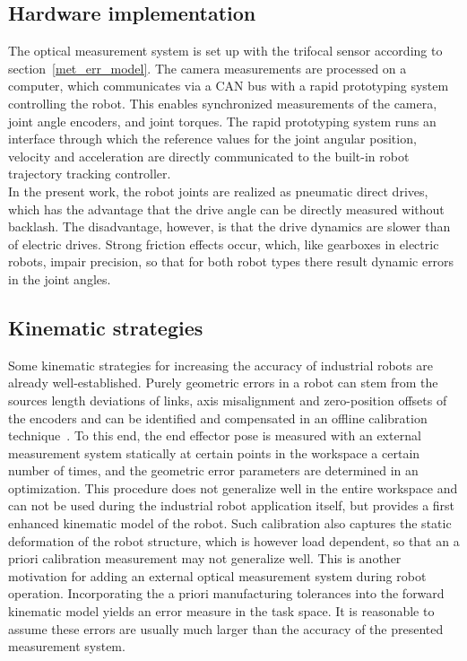 \documentclass[5p,times,procedia]{elsarticle}
\begin{document}
\subsection{Hardware implementation}
The optical measurement system is set up with the trifocal sensor according to section~\ref{met_err_model}.
The camera measurements are processed on a computer, which communicates via a CAN bus with a rapid prototyping system controlling the robot.
This enables synchronized measurements of the camera, joint angle encoders, and joint torques.
The rapid prototyping system runs an interface through which the reference values for the joint angular position, velocity and acceleration are directly communicated to the built-in robot trajectory tracking controller.\\
In the present work, the robot joints are realized as pneumatic direct drives, which has the advantage that the drive angle can be directly measured without backlash. 
The disadvantage, however, is that the drive dynamics are slower than of electric drives. Strong friction effects occur, which, like gearboxes in electric robots, impair precision, so that for both robot types there result dynamic errors in the joint angles. 


\subsection{Kinematic strategies}
Some kinematic strategies for increasing the accuracy of industrial robots are already well-established.
Purely geometric errors in a robot can stem from the sources length deviations of links, axis misalignment and zero-position offsets of the encoders and can be identified and compensated in an offline calibration technique~\cite{Wiest01}.
To this end, the end effector pose is measured with an external measurement system statically at certain points in the workspace a certain number of times, and the geometric error parameters are determined in an optimization.
This procedure does not generalize well in the entire workspace and can not be used during the industrial robot application itself, but provides a first enhanced kinematic model of the robot.
Such calibration also captures the static deformation of the robot structure, which is however load dependent, so that an a priori calibration measurement may not generalize well. This is another motivation for adding an external optical measurement system during robot operation.
Incorporating the a priori manufacturing tolerances into the forward kinematic model yields an error measure in the task space.
It is reasonable to assume these errors are usually much larger than the accuracy of the presented measurement system.
%
\end{document}
